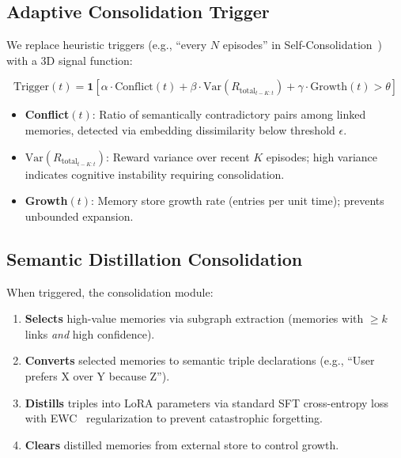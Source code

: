 \documentclass{article}
\newcommand{\rtotal}{R_{\mathrm{total}}}
\begin{document}
\subsection{Adaptive Consolidation Trigger}
\label{sec:trigger}

We replace heuristic triggers (e.g., ``every $N$ episodes'' in Self-Consolidation~\citep{zhang2026selfconsolidation}) with a 3D signal function:

\begin{equation}
\text{Trigger}(t) = \mathbf{1}\left[\alpha \cdot \text{Conflict}(t) + \beta \cdot \text{Var}(\rtotal_{t-K:t}) + \gamma \cdot \text{Growth}(t) > \theta\right]
\label{eq:trigger}
\end{equation}

\begin{itemize}[nosep, leftmargin=*]
    \item \textbf{Conflict$(t)$}: Ratio of semantically contradictory pairs among linked memories, detected via embedding dissimilarity below threshold $\epsilon$.
    \item \textbf{$\text{Var}(\rtotal_{t-K:t})$}: Reward variance over recent $K$ episodes; high variance indicates cognitive instability requiring consolidation.
    \item \textbf{Growth$(t)$}: Memory store growth rate (entries per unit time); prevents unbounded expansion.
\end{itemize}

\subsection{Semantic Distillation Consolidation}
\label{sec:distill}

When triggered, the consolidation module:
\begin{enumerate}[nosep, leftmargin=*]
    \item \textbf{Selects} high-value memories via subgraph extraction (memories with $\geq k$ links \emph{and} high confidence).
    \item \textbf{Converts} selected memories to semantic triple declarations (e.g., ``User prefers X over Y because Z'').
    \item \textbf{Distills} triples into LoRA parameters via standard SFT cross-entropy loss with EWC~\citep{kirkpatrick2017ewc} regularization to prevent catastrophic forgetting.
    \item \textbf{Clears} distilled memories from external store to control growth.
\end{enumerate}
\end{document}
